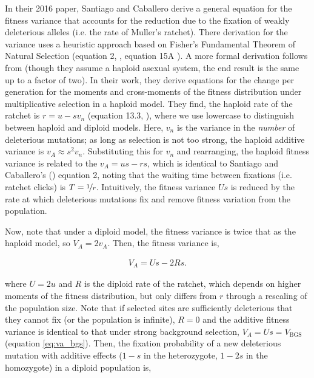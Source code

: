 \documentclass[11pt]{article}
\begin{document}

In their 2016 paper, Santiago and Caballero derive a general equation for the
fitness variance that accounts for the reduction due to the fixation of weakly
deleterious alleles (i.e. the rate of Muller's ratchet). There derivation for
the variance uses a heuristic approach based on Fisher's Fundamental Theorem of
Natural Selection (equation 2, \cite{Santiago2016-mu}, equation 15A
\cite{Garcia-Dorado2007-jj}). A more formal derivation follows from
\textcite{Higgs1995-xc} (though they assume a haploid asexual system, the end
result is the same up to a factor of two). In their work, they derive equations
for the change per generation for the moments and cross-moments of the fitness
distribution under multiplicative selection in a haploid model. They find, the
haploid rate of the ratchet is $r = u - s v_n$ (equation 13.3,
\cite{Higgs1995-xc}), where we use lowercase to distinguish between haploid and
diploid models. Here, $v_n$ is the variance in the \emph{number} of deleterious
mutations; as long as selection is not too strong, the haploid additive
variance is $v_{A} \approx s^2 v_n$. Substituting this for $v_n$ and
rearranging, the haploid fitness variance is related to the $v_A = us - rs$,
which is identical to Santiago and Caballero's (\citeyear{Santiago2016-mu})
equation 2, noting that the waiting time between fixations (i.e. ratchet
clicks) is $T = \nicefrac{1}{r}$. Intuitively, the fitness variance $Us$ is
reduced by the rate at which deleterious mutations fix and remove fitness
variation from the population.

Now, note that under a diploid model, the fitness variance is twice that as the
haploid model, so $V_A = 2 v_A$. Then, the fitness variance is,

\begin{align}
  V_{A} = Us - 2Rs. 
\end{align}

where $U = 2u$ and $R$ is the diploid rate of the ratchet, which depends on
higher moments of the fitness distribution, but only differs from $r$ through a
rescaling of the population size. Note that if selected sites are sufficiently
deleterious that they cannot fix (or the population is infinite), $R=0$ and the
additive fitness variance is identical to that under strong background
selection, $V_A = Us = V_\text{BGS}$ (equation \eqref{eq:va_bgs}). Then, the
fixation probability of a new deleterious mutation with additive effects ($1-s$
in the heterozygote, $1-2s$ in the homozygote) in a diploid population is,
\end{document}
